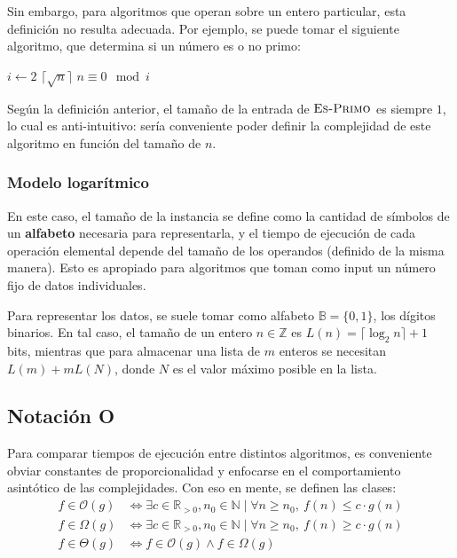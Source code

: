\documentclass[a4paper]{report}
\newcommand{\BigO}[1]{\ensuremath{\mathcal{O}(#1)}}
\newcommand{\BigOmega}[1]{\ensuremath{\Omega(#1)}}
\newcommand{\BigTheta}[1]{\ensuremath{\Theta(#1)}}
\newcommand{\N}{\mathbb{N}}
\newcommand{\Z}{\mathbb{Z}}
\newcommand{\R}{\mathbb{R}}
\begin{document}
Sin embargo, para algoritmos que operan sobre un entero particular, esta definición no resulta adecuada. Por ejemplo, se puede tomar el siguiente algoritmo, que determina si un número es o no primo:
\begin{codebox}
    \li \For $i \gets 2$ \To $\lceil\sqrt{n}\rceil$ \Do
    \li \If $n \equiv 0 \mod{i}$ \Then
    \li \Return {}
    \End
    \End
    \li \Return {}
\end{codebox}

Según la definición anterior, el tamaño de la entrada de $\textnormal{\scshape Es-Primo}$ es siempre $1$, lo cual es anti-intuitivo: sería conveniente poder definir la complejidad de este algoritmo en función del tamaño de $n$.

\subsubsection{Modelo logarítmico}

En este caso, el tamaño de la instancia se define como la cantidad de símbolos de un \textbf{alfabeto} necesaria para representarla, y el tiempo de ejecución de cada operación elemental depende del tamaño de los operandos (definido de la misma manera). Esto es apropiado para algoritmos que toman como input un número fijo de datos individuales.

Para representar los datos, se suele tomar como alfabeto $\mathbb{B} = \{0, 1\}$, los dígitos binarios. En tal caso, el tamaño de un entero $n \in \Z$ es $L(n) = \lceil\log_2{n}\rceil + 1$ bits, mientras que para almacenar una lista de $m$ enteros se necesitan $L(m) + mL(N)$, donde $N$ es el valor máximo posible en la lista.

\subsection{Notación O}

Para comparar tiempos de ejecución entre distintos algoritmos, es conveniente obviar constantes de proporcionalidad y enfocarse en el comportamiento asintótico de las complejidades. Con eso en mente, se definen las clases:
\begin{align*}
    f \in \BigO{g}     & \iff \exists c \in \R_{>0}, n_0 \in \N \mid \forall n \geq n_0,\ f(n) \leq c \cdot g(n) \\
    f \in \BigOmega{g} & \iff \exists c \in \R_{>0}, n_0 \in \N \mid \forall n \geq n_0,\ f(n) \geq c \cdot g(n) \\
    f \in \BigTheta{g} & \iff f \in \BigO{g} \land f \in \BigOmega{g}
\end{align*}
\end{document}
